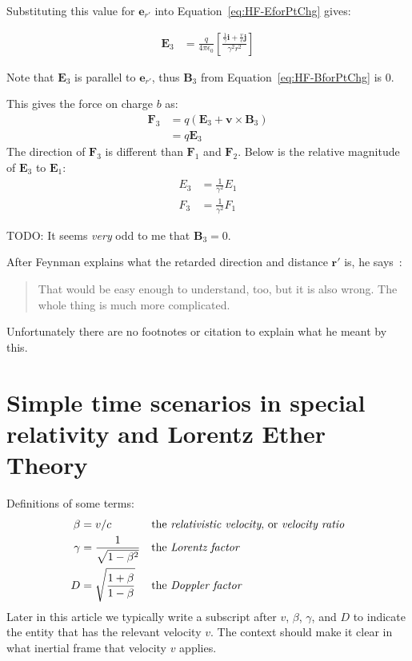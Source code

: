 \documentclass[a4paper]{article}
\theoremstyle{plain}
\theoremstyle{definition}
\newcommand{\ihat}{\mathbf{i}}
\newcommand{\jhat}{\mathbf{j}}
\newcommand{\vect}[1]{\mathbf{#1}}
\begin{document}
Substituting this value for $\vect{e}_{r'}$ into
Equation~\eqref{eq:HF-EforPtChg} gives:

\begin{align*}
\vect{E}_3 & = \frac{q}{4 \pi \epsilon_0}
             \left[
               \frac{\frac{1}{\gamma} \ihat + \frac{v}{c} \jhat}{\gamma^2 r^2}
             \right]
\end{align*}

Note that $\vect{E}_3$ is parallel to $\vect{e}_{r'}$, thus
$\vect{B}_3$ from Equation~\eqref{eq:HF-BforPtChg} is 0.

This gives the force on charge $b$ as:
\begin{align*}
\vect{F}_3
  & = q (\vect{E}_3 + \vect{v} \times \vect{B}_3) \\
  & = q \vect{E}_3
\end{align*}
The direction of $\vect{F}_3$ is different than $\vect{F}_1$ and $\vect{F}_2$.
Below is the relative magnitude of $\vect{E}_3$ to $\vect{E}_1$:
\begin{align*}
E_3 & = \frac{1}{\gamma^2} E_1 \\
F_3 & = \frac{1}{\gamma^2} F_1
\end{align*}

TODO: It seems {\em very} odd to me that $\vect{B}_3 = 0$.

After Feynman explains what the retarded direction and distance
$\vect{r'}$ is, he says~\cite{FeynmanLecturesVolICh28}:
\begin{quote}
That would be easy enough to understand, too, but it is also
wrong.  The whole thing is much more complicated.
\end{quote}
Unfortunately there are no footnotes or citation to explain what he
meant by this.


\section{Simple time scenarios in special relativity and Lorentz Ether Theory}
\label{sec:simple-sr-time}

Definitions of some terms:
\begin{align}
  \beta & = v / c \label{defn:betaB} & & \text{the {\em relativistic velocity}, or {\em velocity ratio}} \\
  \gamma & = \frac{1}{\sqrt{1 - \beta^2}} & & \text{the {\em Lorentz factor}} \label{defn:LorentzFactor} \\
  D & = \sqrt{ \frac{1 + \beta}{1 - \beta} } & & \text{the {\em Doppler factor}} \label{defn:DopplerFactor}
\end{align}
Later in this article we typically write a subscript after $v$,
$\beta$, $\gamma$, and $D$ to indicate the entity that has the
relevant velocity $v$.  The context should make it clear in what
inertial frame that velocity $v$ applies.
\end{document}
